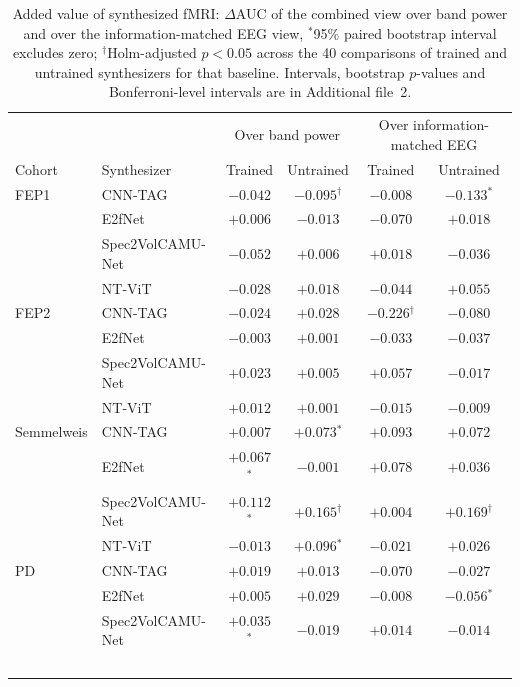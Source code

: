 \documentclass[pdflatex,referee,sn-basic]{sn-jnl}%
\begin{document}
\begin{table}[!htbp]
    \centering
    \caption{Added value of synthesized fMRI: $\Delta$AUC of the combined view over band power and over the information-matched EEG view, $^{*}$95\% paired bootstrap interval excludes zero; $^{\dagger}$Holm-adjusted $p<0.05$ across the 40 comparisons of trained and untrained synthesizers for that baseline. Intervals, bootstrap $p$-values and Bonferroni-level intervals are in Additional file~2.}
    \label{tab:delta}
    \scriptsize\setlength{\tabcolsep}{3pt}
    \begin{tabular}{@{}l l c c c c@{}}
        \hline
        & & \multicolumn{2}{c}{Over band power} & \multicolumn{2}{c}{Over information-matched EEG} \\
        Cohort & Synthesizer & Trained & Untrained & Trained & Untrained \\
        \hline
        FEP1 & CNN-TAG & $-0.042$ & $-0.095$$^{\dagger}$ & $-0.008$ & $-0.133$$^{*}$ \\
         & E2fNet & $+0.006$ & $-0.013$ & $-0.070$ & $+0.018$ \\
         & Spec2VolCAMU-Net & $-0.052$ & $+0.006$ & $+0.018$ & $-0.036$ \\
         & NT-ViT & $-0.028$ & $+0.018$ & $-0.044$ & $+0.055$ \\
        \hline
        FEP2 & CNN-TAG & $-0.024$ & $+0.028$ & $-0.226$$^{\dagger}$ & $-0.080$ \\
         & E2fNet & $-0.003$ & $+0.001$ & $-0.033$ & $-0.037$ \\
         & Spec2VolCAMU-Net & $+0.023$ & $+0.005$ & $+0.057$ & $-0.017$ \\
         & NT-ViT & $+0.012$ & $+0.001$ & $-0.015$ & $-0.009$ \\
        \hline
        Semmelweis & CNN-TAG & $+0.007$ & $+0.073$$^{*}$ & $+0.093$ & $+0.072$ \\
         & E2fNet & $+0.067$$^{*}$ & $-0.001$ & $+0.078$ & $+0.036$ \\
         & Spec2VolCAMU-Net & $+0.112$$^{*}$ & $+0.165$$^{\dagger}$ & $+0.004$ & $+0.169$$^{\dagger}$ \\
         & NT-ViT & $-0.013$ & $+0.096$$^{*}$ & $-0.021$ & $+0.026$ \\
        \hline
        PD & CNN-TAG & $+0.019$ & $+0.013$ & $-0.070$ & $-0.027$ \\
         & E2fNet & $+0.005$ & $+0.029$ & $-0.008$ & $-0.056$$^{*}$ \\
         & Spec2VolCAMU-Net & $+0.035$$^{*}$ & $-0.019$ & $+0.014$ & $-0.014$ \\
$$
\end{tabular}
\end{table}
\end{document}
